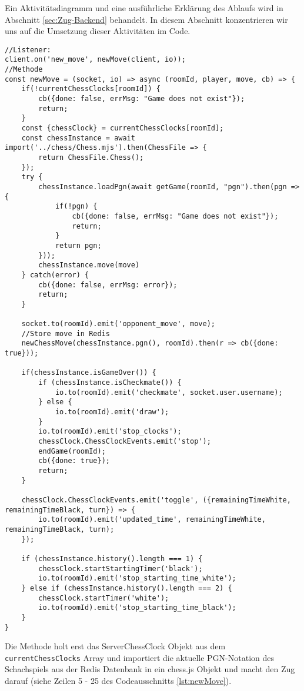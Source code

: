Ein Aktivitätsdiagramm und eine ausführliche Erklärung des Ablaufs wird in Abschnitt \ref{sec:Zug-Backend} behandelt. In diesem Abschnitt konzentrieren wir uns auf die Umsetzung dieser Aktivitäten im Code.
\begin{lstlisting}[style=codeStyle, caption={newMove Methode die beim Eingang eines neuen Zugs aufgerufen wird}, label={lst:newMove}]
//Listener:
client.on('new_move', newMove(client, io));
//Methode
const newMove = (socket, io) => async (roomId, player, move, cb) => {
    if(!currentChessClocks[roomId]) {
        cb({done: false, errMsg: "Game does not exist"});
        return;
    }
    const {chessClock} = currentChessClocks[roomId];
    const chessInstance = await import('../chess/Chess.mjs').then(ChessFile => {
        return ChessFile.Chess();
    });
    try {
        chessInstance.loadPgn(await getGame(roomId, "pgn").then(pgn => {
            if(!pgn) {
                cb({done: false, errMsg: "Game does not exist"});
                return;
            }
            return pgn;
        }));
        chessInstance.move(move)
    } catch(error) {
        cb({done: false, errMsg: error});
        return;
    }
	
    socket.to(roomId).emit('opponent_move', move);
    //Store move in Redis
    newChessMove(chessInstance.pgn(), roomId).then(r => cb({done: true}));
    
    if(chessInstance.isGameOver()) {
        if (chessInstance.isCheckmate()) {
            io.to(roomId).emit('checkmate', socket.user.username);
        } else {
            io.to(roomId).emit('draw');
        }
        io.to(roomId).emit('stop_clocks');
        chessClock.ChessClockEvents.emit('stop');
        endGame(roomId);
        cb({done: true});
        return;
    }
    
    chessClock.ChessClockEvents.emit('toggle', ({remainingTimeWhite, remainingTimeBlack, turn}) => {
        io.to(roomId).emit('updated_time', remainingTimeWhite, remainingTimeBlack, turn);
    });

    if (chessInstance.history().length === 1) {
        chessClock.startStartingTimer('black');
        io.to(roomId).emit('stop_starting_time_white');
    } else if (chessInstance.history().length === 2) {
        chessClock.startTimer('white');
        io.to(roomId).emit('stop_starting_time_black');
    }
}
\end{lstlisting}

Die Methode holt erst das ServerChessClock Objekt aus dem \verb|currentChessClocks| Array und importiert die aktuelle PGN-Notation des Schachspiels aus der Redis Datenbank in ein chess.js Objekt und macht den Zug darauf (siehe Zeilen 5 - 25 des Codeausschnitts \ref{lst:newMove}).

